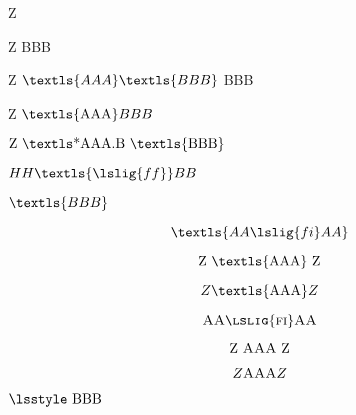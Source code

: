 \documentclass{article}
\begin{document}
\showboxdepth\maxdimen
\showboxbreadth\maxdimen

Z 

 Z   BBB

  Z $\textls{AAA} \textls{BBB}$ BBB

  Z $\textrm{\textls{AAA}} BBB$

  $\textrm{Z \textls*{AAA}.B \textls{BBB}}$

  $\mathchoice{a B}{HH \textls{\lslig{ff}} BB}{}{}$

  $\mathchoice{\textls{AAA}}{\textls{BBB}}{C}{D}$

  \[\mathchoice{\textls{AA\lslig{fi}AA}}{\textls{BBB}}{C}{D}\]

  \[\mathchoice{\text{Z \textls{AAA} Z}}{\textls{BBB}}{C}{D}\]

  \[\mathchoice{Z \text{\textls{AAA}} Z}{\textls{BBB}}{C}{D}\]

  \[\mathchoice{\textsc{AA\lslig{fi}AA}}{\textsc{BBB}}{C}{D}\]

  \[\mathchoice{\text{Z {\scshape AAA} Z}}{\textsc{BBB}}{C}{D}\]

  \[\mathchoice{Z \text{\scshape AAA} Z}{\textsc{BBB}}{C}{D}\]


  $\mathchoice{\textrm{\lsstyle AAA}}{\textrm{\lsstyle BBB}}{C}{D}$

\end{document}
